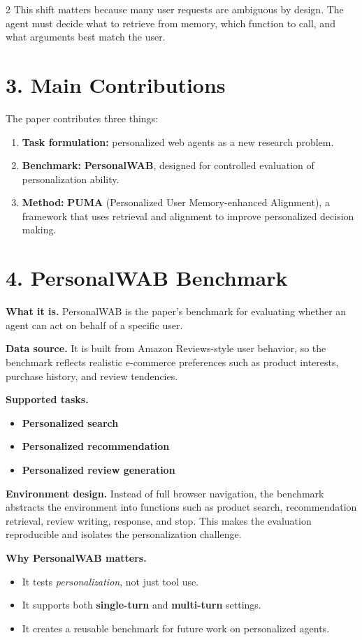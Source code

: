 \documentclass{article}
\begin{document}
\begin{multicols}{2}
This shift matters because many user requests are ambiguous by design. The agent must decide what to retrieve from memory, which function to call, and what arguments best match the user.

\section*{3. Main Contributions}
The paper contributes three things:

\begin{enumerate}[leftmargin=1.3em,itemsep=0.2em,topsep=0.2em]
	\item \textbf{Task formulation:} personalized web agents as a new research problem.
	\item \textbf{Benchmark:} \textbf{PersonalWAB}, designed for controlled evaluation of personalization ability.
	\item \textbf{Method:} \textbf{PUMA} (Personalized User Memory-enhanced Alignment), a framework that uses retrieval and alignment to improve personalized decision making.
\end{enumerate}

\section*{4. PersonalWAB Benchmark}
\textbf{What it is.} PersonalWAB is the paper's benchmark for evaluating whether an agent can act on behalf of a specific user.

\textbf{Data source.} It is built from Amazon Reviews-style user behavior, so the benchmark reflects realistic e-commerce preferences such as product interests, purchase history, and review tendencies.

\textbf{Supported tasks.}
\begin{itemize}[leftmargin=1.1em,itemsep=0.2em,topsep=0.2em]
	\item \textbf{Personalized search}
	\item \textbf{Personalized recommendation}
	\item \textbf{Personalized review generation}
\end{itemize}

\textbf{Environment design.} Instead of full browser navigation, the benchmark abstracts the environment into functions such as product search, recommendation retrieval, review writing, response, and stop. This makes the evaluation reproducible and isolates the personalization challenge.

\textbf{Why PersonalWAB matters.}
\begin{itemize}[leftmargin=1.1em,itemsep=0.2em,topsep=0.2em]
	\item It tests \emph{personalization}, not just tool use.
	\item It supports both \textbf{single-turn} and \textbf{multi-turn} settings.
	\item It creates a reusable benchmark for future work on personalized agents.
\end{itemize}


\end{multicols}
\end{document}
